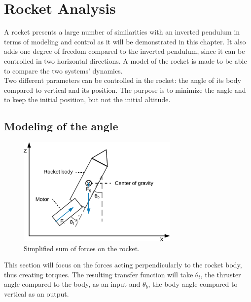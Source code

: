 

\chapter{Rocket Analysis}

		A rocket presents a large number of similarities with an inverted pendulum in terms of modeling and control as it will be demonstrated in this chapter. It also adds one degree of freedom compared to the inverted pendulum, since it can be controlled in two horizontal directions. A model of the rocket is made to be able to compare the two systems' dynamics.
		\\
		Two different parameters can be controlled in the rocket: the angle of its body compared to vertical and its position.
		The purpose is to minimize the angle and to keep the initial position, but not the initial altitude.
		
		
		\section{Modeling of the angle}
		\begin{figure}[htbp]
			\centering
			\includegraphics[width=0.7\textwidth]{figures/modeling/Rocket/rocket_angle_diagram.png}
			\caption{Simplified sum of forces on the rocket.}
			\label{fig:angle_diagram}
		\end{figure}
		
		This section will focus on the forces acting perpendicularly to the rocket body, thus creating torques.
		The resulting transfer function will take $\theta_t$, the thruster angle compared to the body, as an input and $\theta_b$, the body angle compared to vertical as an output.
		
